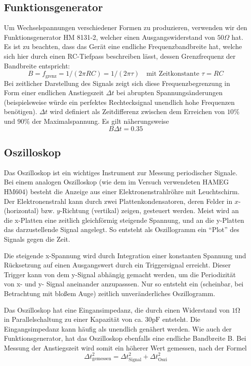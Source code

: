 \documentclass{article}
\begin{document}
\subsection{Funktionsgenerator}
Um Wechselspannungen verschiedener Formen zu produzieren, verwenden wir den Funktionsgenerator HM 8131-2,
welcher einen Ausgangswiderstand von $50\Omega$ hat. Es ist zu beachten, dass das Gerät eine endliche
Frequenzbandbreite hat, welche sich hier durch einen RC-Tiefpass beschreiben lässt, dessen Grenzfrequenz der
Bandbreite entspricht:
\begin{equation}
  B = f_\text{grenz} = 1/(2\pi RC) = 1 / (2\pi \tau) \quad \text{mit Zeitkonstante } \tau = RC
\end{equation}
Bei zeitlicher Darstellung des Signals zeigt sich diese Frequenzbegrenzung in Form einer endlichen Anstiegszeit $\Delta t$ bei abrupten
Spannungsänderungen (beispielsweise würde ein perfektes Rechtecksignal unendlich hohe Frequenzen benötigen). $\Delta t$ wird definiert
als Zeitdifferenz zwischen dem Erreichen von $10 \%$ und $ 90\%$ der Maximalspannung. Es gilt näherungsweise
\begin{equation}
  B \Delta t = 0.35 \label{eq:bdeltat}
\end{equation}

\subsection{Oszilloskop}
Das Oszilloskop ist ein wichtiges Instrument zur Messung periodischer Signale. Bei einem analogen Oszilloskop
(wie dem im Versuch verwendeten HAMEG HM604)
besteht die Anzeige aus einer Elektronenstrahlröhre mit Leuchtschirm. Der Elektronenstrahl kann durch zwei Plattenkondensatoren,
deren Felder in $x$- (horizontal) bzw. $y$-Richtung (vertikal) zeigen, gesteuert werden. Meist wird an die x-Platten
eine zeitlich gleichförmig steigende Spannung, und an die y-Platten das darzustellende Signal angelegt. So entsteht als
Oszillogramm ein \enquote{Plot} des Signals gegen die Zeit.

Die steigende x-Spannung wird durch Integration einer konstanten Spannung
und Rücksetzung auf einen Ausgangswert durch ein Triggersignal erreicht. Dieser Trigger kann von dem y-Signal abhängig
gemacht werden, um die Periodizität von x- und y- Signal aneinander anzupasssen. Nur so entsteht ein
(scheinbar, bei Betrachtung mit bloßem Auge) zeitlich unveränderliches Oszillogramm.

Das Oszilloskop hat eine Eingansimpedanz, die durch einen Widerstand von $1\mathrm{\Omega}$ in Parallelschaltung zu
einer Kapazität von ca. $30\mathrm{pF}$ entsteht. Die Eingangsimpedanz kann häufig als unendlich genähert werden.
Wie auch der Funktionsgenerator, hat das Oszilloskop ebenfalls eine endliche Bandbreite B. Bei Messung der Anstiegszeit
wird somit ein höherer Wert gemessen, nach der Formel
\begin{equation}
  \Delta t^2_\text{gemessen} = \Delta t^2_\text{Signal} + \Delta t^2_\text{Oszi} \label{eq:anstiegszeit-eff}
\end{equation}
\end{document}
